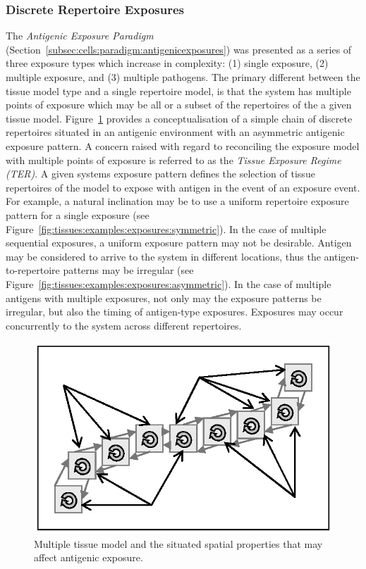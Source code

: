 \subsubsection{Discrete Repertoire Exposures}
\label{subsubsec:tissues:paradigm:exposures:discrete}
The \emph{Antigenic Exposure Paradigm} (Section~\ref{subsec:cells:paradigm:antigenicexposures}) was presented as a series of three exposure types which increase in complexity: (1) single exposure, (2) multiple exposure, and (3) multiple pathogens. The primary different between the tissue model type and a single repertoire model, is that the system has multiple points of exposure which may be all or a subset of the repertoires of the a given tissue model. Figure~\ref{fig:tissues:exposures:model} provides a conceptualisation of a simple chain of discrete repertoires situated in an antigenic environment with an asymmetric antigenic exposure pattern. 
A concern raised with regard to reconciling the exposure model with multiple points of exposure is referred to as the \emph{Tissue Exposure Regime (TER)}. A given systems exposure pattern defines the selection of tissue repertoires of the model to expose with antigen in the event of an exposure event. For example, a natural inclination may be to use a uniform repertoire exposure pattern for a single exposure (see Figure~\ref{fig:tissues:examples:exposures:symmetric}). In the case of multiple sequential exposures, a uniform exposure pattern may not be desirable. Antigen may be considered to arrive to the system in different locations, thus the antigen-to-repertoire patterns may be irregular (see Figure~\ref{fig:tissues:examples:exposures:asymmetric}). In the case of multiple antigens with multiple exposures, not only may the exposure patterns be irregular, but also the timing of antigen-type exposures. Exposures may occur concurrently to the system across different repertoires. 

\begin{figure}[ht]
	\centering
	\includegraphics[scale=0.75]{Tissues/tissues-antigen}
	\caption{Multiple tissue model and the situated spatial properties that may affect antigenic exposure.}
	\label{fig:tissues:exposures:model}
\end{figure}

